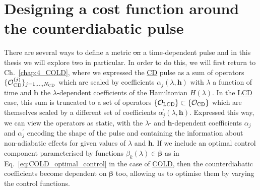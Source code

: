 \documentclass[a4paper,oneside,11pt]{book}
\newcommand{\betabb}{\boldsymbol{\beta}}
\newcommand{\hbb}{\boldsymbol{h}}
\newcommand{\acrref}[1]{\hyperref[acr:#1]{#1}}
\providecommand{\DIFaddtex}[1]{{\protect\color{blue}\uwave{#1}}} %
\providecommand{\DIFdeltex}[1]{{\protect\color{red}\sout{#1}}}                      %
\providecommand{\DIFaddbegin}{} %
\providecommand{\DIFaddend}{} %
\providecommand{\DIFdelbegin}{} %
\providecommand{\DIFdelend}{} %
\providecommand{\DIFadd}[1]{\texorpdfstring{\DIFaddtex{#1}}{#1}} %
\providecommand{\DIFdel}[1]{\texorpdfstring{\DIFdeltex{#1}}{}} %
\newcommand{\DIFscaledelfig}{0.5}
\newlength{\DIFdelgraphicswidth} %
\newlength{\DIFdelgraphicsheight} %
\newcommand{\DIFaddincludegraphics}[2][]{{\color{blue}\fbox{\DIFOincludegraphics[#1]{#2}}}} %
\newcommand{\DIFdelincludegraphics}[2][]{%
\sbox{\DIFdelgraphicsbox}{\DIFOincludegraphics[#1]{#2}}%
\settoboxwidth{\DIFdelgraphicswidth}{\DIFdelgraphicsbox} %
\settoboxtotalheight{\DIFdelgraphicsheight}{\DIFdelgraphicsbox} %
\scalebox{\DIFscaledelfig}{%
\parbox[b]{\DIFdelgraphicswidth}{\usebox{\DIFdelgraphicsbox}\\[-\baselineskip] \rule{\DIFdelgraphicswidth}{0em}}\llap{\resizebox{\DIFdelgraphicswidth}{\DIFdelgraphicsheight}{%
\setlength{\unitlength}{\DIFdelgraphicswidth}%
\begin{picture}(1,1)%
\thicklines\linethickness{2pt} %
{\color[rgb]{1,0,0}\put(0,0){\framebox(1,1){}}}%
{\color[rgb]{1,0,0}\put(0,0){\line( 1,1){1}}}%
{\color[rgb]{1,0,0}\put(0,1){\line(1,-1){1}}}%
\end{picture}%
}\hspace*{3pt}}} %
} %
\DeclareRobustCommand{\DIFaddbegin}{\DIFOaddbegin \let\includegraphics\DIFaddincludegraphics} %
\DeclareRobustCommand{\DIFaddend}{\DIFOaddend \let\includegraphics\DIFOincludegraphics} %
\DeclareRobustCommand{\DIFdelbegin}{\DIFOdelbegin \let\includegraphics\DIFdelincludegraphics} %
\DeclareRobustCommand{\DIFdelend}{\DIFOaddend \let\includegraphics\DIFOincludegraphics} %
\begin{document}
\section{Designing a cost function around the counterdiabatic pulse}\label{sec:5.2_designing_costfunc_hocd}

There are several ways to define a metric \DIFdelbegin \DIFdel{on }\DIFdelend \DIFaddbegin \DIFadd{for }\DIFaddend a time-dependent \DIFaddbegin \DIFadd{control }\DIFaddend pulse and in this thesis we will explore two in particular. In order to do this, we will first return to Ch.~\ref{chap:4_COLD}, where we expressed the \acrref{CD} pulse as a sum of operators $\{\mathcal{O}_{\rm CD}^{(j)}\}_{j = 1, ..., N_{\rm CD}}$ which are scaled by coefficients $\alpha_j(\lambda, \hbb)$ with $\lambda$ a function of time and $\hbb$ the $\lambda$-dependent coefficients of the Hamiltonian $H(\lambda)$. In the \acrref{LCD} case, this sum is truncated to a set of operators \DIFdelbegin \DIFdel{$\{\mathcal{O}_{\rm LCD}\} \subset \{\mathcal{O}_{\rm CD}\}$ }\DIFdelend \DIFaddbegin \DIFadd{$\mathcal{O}_{\rm LCD} \subset \mathcal{O}_{\rm CD}$ }\DIFaddend which are themselves scaled by a different set of coefficients $\alpha_j^{\prime}(\lambda, \hbb)$. Expressed this way, we can view the operators as static, with the $\lambda$- and $\hbb$-dependent coefficients $\alpha_j$ and $\alpha_j^{\prime}$ encoding the shape of the pulse and containing the information about non-adiabatic effects for given values of $\lambda$ and $\hbb$. If we include an optimal control component parameterised by functions $\beta_k(\lambda) \in \betabb$ as in Eq.~\eqref{eq:COLD_optimal_control} in the case of \acrref{COLD}, then the counterdiabatic coefficients become dependent on $\betabb$ too, allowing us to optimise them by varying the control functions.
\end{document}
